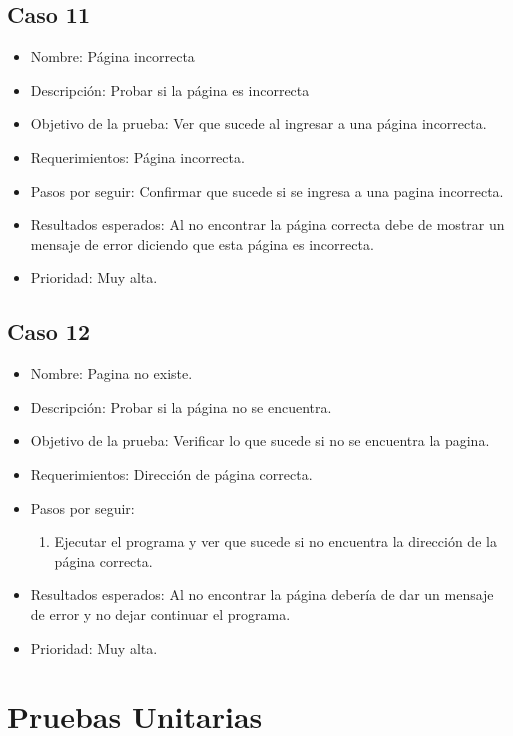 \documentclass[conference]{IEEEtran}
\begin{document}
\subsection{Caso 11}
\begin{itemize}
\item Nombre: Página incorrecta
\item Descripción: Probar si la página es incorrecta
\item Objetivo de la prueba: Ver que sucede al ingresar a una página incorrecta.
\item Requerimientos: Página incorrecta.
\item Pasos por seguir: Confirmar que sucede si se ingresa a una pagina incorrecta.
\item Resultados esperados: Al no encontrar la página correcta debe de mostrar un mensaje de error diciendo que esta página es incorrecta.
\item Prioridad: Muy alta.
\end{itemize}

\subsection{Caso 12}
\begin{itemize}
\item Nombre: Pagina no existe.
\item Descripción: Probar si la página no se encuentra.
\item Objetivo de la prueba: Verificar lo que sucede si no se encuentra la pagina.
\item Requerimientos: Dirección de página correcta.
\item Pasos por seguir: 
\begin{enumerate}
\item Ejecutar el programa y ver que sucede si no encuentra la dirección de la página correcta.
\end{enumerate}
\item Resultados esperados: Al no encontrar la página debería de dar un mensaje de error y no dejar continuar el programa.
\item Prioridad: Muy alta. 
\end{itemize}

\newpage
\section{Pruebas Unitarias}
\end{document}
